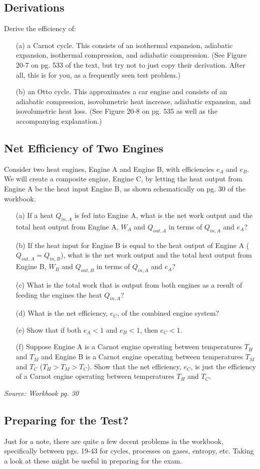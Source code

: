 \documentclass{article}
\begin{document}
\subsection{Derivations}

Derive the efficiency of:
\begin{itemize}
	\item[(a)] a Carnot cycle. This consists of an isothermal expansion, adiabatic expansion, isothermal compression, and adiabatic compression. (See Figure 20-7 on pg. 533 of the text, but try not to just copy their derivation. After all, this is for you, as a frequently seen test problem.)
	\item[(b)] an Otto cycle. This approximates a car engine and consists of an adiabatic compression, isovolumetric heat increase, adiabatic expansion, and isovolumetric heat loss. (See Figure 20-8 on pg. 535 as well as the accompanying explanation.)
\end{itemize}

\subsection{Net Efficiency of Two Engines}

Consider two heat engines, Engine A and Engine B, with efficiencies $e_A$ and $e_B$. We will create a composite engine, Engine C, by letting the heat output from Engine A be the heat input Engine B, as shown schematically on pg. 30 of the workbook.

\begin{itemize}
	\item[(a)] If a heat $Q_{in,A}$ is fed into Engine A, what is the net work output and the total heat output from Engine A, $W_A$ and $Q_{out,A}$ in terms of $Q_{in,A}$ and $e_A$?
	\item[(b)] If the heat input for Engine B is equal to the heat output of Engine A ($Q_{out,A}=Q_{in,B}$), what is the net work output and the total heat output from Engine B, $W_B$ and $Q_{out,B}$ in terms of $Q_{in,A}$ and $e_A$?
	\item[(c)] What is the total work that is output from both engines as a result of feeding the engines the heat $Q_{in,A}$?
	\item[(d)] What is the net efficiency, $e_C$, of the combined engine system?
	\item[(e)] Show that if both $e_A<1$ and $e_B<1$, then $e_C<1$.
	\item[(f)] Suppose Engine A is a Carnot engine operating between temperatures $T_H$ and $T_M$ and Engine B is a Carnot engine operating between temperatures $T_M$ and $T_C$ ($T_H>T_M>T_C$). Show that the net efficiency, $e_C$, is just the efficiency of a Carnot engine operating between temperatures $T_H$ and $T_C$.
\end{itemize}

\textit{Source: Workbook pg. 30}

\subsection{Preparing for the Test?}

Just for a note, there are quite a few decent problems in the workbook, specifically between pgs. 19-43 for cycles, processes on gases, entropy, etc. Taking a look at these might be useful in preparing for the exam.
\end{document}
